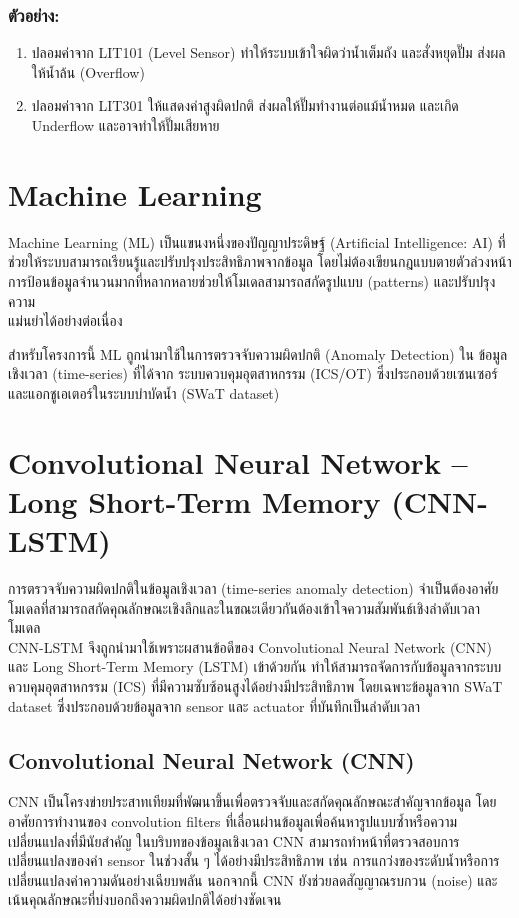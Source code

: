 \subsubsection*{ตัวอย่าง:}
\begin{enumerate}
  \item ปลอมค่าจาก LIT101 (Level Sensor) ทำให้ระบบเข้าใจผิดว่าน้ำเต็มถัง และสั่งหยุดปั๊ม ส่งผลให้น้ำล้น (Overflow)
  \item ปลอมค่าจาก LIT301 ให้แสดงค่าสูงผิดปกติ ส่งผลให้ปั๊มทำงานต่อแม้น้ำหมด และเกิด Underflow และอาจทำให้ปั๊มเสียหาย
\end{enumerate}

\section{Machine Learning}
\hspace{2em} Machine Learning (ML) เป็นแขนงหนึ่งของปัญญาประดิษฐ์ (Artificial Intelligence: AI) ที่ช่วยให้ระบบสามารถเรียนรู้และปรับปรุงประสิทธิภาพจากข้อมูล โดยไม่ต้องเขียนกฎแบบตายตัวล่วงหน้า การป้อนข้อมูลจำนวนมากที่หลากหลายช่วยให้โมเดลสามารถสกัดรูปแบบ (patterns) และปรับปรุงความ \\ แม่นยำได้อย่างต่อเนื่อง

สำหรับโครงการนี้ ML ถูกนำมาใช้ในการตรวจจับความผิดปกติ (Anomaly Detection) ใน ข้อมูลเชิงเวลา (time-series) ที่ได้จาก ระบบควบคุมอุตสาหกรรม (ICS/OT) ซึ่งประกอบด้วยเซนเซอร์และแอกชูเอเตอร์ในระบบบำบัดน้ำ (SWaT dataset)

\section{Convolutional Neural Network – Long Short-Term Memory (CNN-LSTM)}
\hspace{2em} การตรวจจับความผิดปกติในข้อมูลเชิงเวลา (time-series anomaly detection) จำเป็นต้องอาศัยโมเดลที่สามารถสกัดคุณลักษณะเชิงลึกและในขณะเดียวกันต้องเข้าใจความสัมพันธ์เชิงลำดับเวลา โมเดล \\ CNN-LSTM จึงถูกนำมาใช้เพราะผสานข้อดีของ Convolutional Neural Network (CNN) และ Long Short-Term Memory (LSTM) เข้าด้วยกัน ทำให้สามารถจัดการกับข้อมูลจากระบบควบคุมอุตสาหกรรม (ICS) ที่มีความซับซ้อนสูงได้อย่างมีประสิทธิภาพ โดยเฉพาะข้อมูลจาก SWaT dataset ซึ่งประกอบด้วยข้อมูลจาก sensor และ actuator ที่บันทึกเป็นลำดับเวลา

\subsection{Convolutional Neural Network (CNN)}
\hspace{2em} CNN เป็นโครงข่ายประสาทเทียมที่พัฒนาขึ้นเพื่อตรวจจับและสกัดคุณลักษณะสำคัญจากข้อมูล โดยอาศัยการทำงานของ convolution filters ที่เลื่อนผ่านข้อมูลเพื่อค้นหารูปแบบซ้ำหรือความเปลี่ยนแปลงที่มีนัยสำคัญ ในบริบทของข้อมูลเชิงเวลา CNN สามารถทำหน้าที่ตรวจสอบการเปลี่ยนแปลงของค่า sensor ในช่วงสั้น ๆ ได้อย่างมีประสิทธิภาพ เช่น การแกว่งของระดับน้ำหรือการเปลี่ยนแปลงค่าความดันอย่างเฉียบพลัน นอกจากนี้ CNN ยังช่วยลดสัญญาณรบกวน (noise) และเน้นคุณลักษณะที่บ่งบอกถึงความผิดปกติได้อย่างชัดเจน

